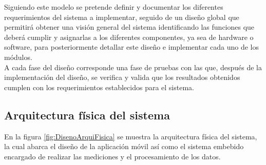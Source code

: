 \documentclass[journal]{IEEEtran}
\begin{document}
Siguiendo este modelo se pretende definir y documentar los diferentes requerimientos del sistema a implementar, seguido de un diseño global que permitirá obtener una visión general del sistema identificando las funciones que deberá cumplir y asignarlas a los diferentes componentes, ya sea de hardware o software, para posteriormente detallar este diseño e implementar cada uno de los módulos. \\

A cada fase del diseño corresponde una fase de pruebas con las que, después de la implementación del diseño, se verifica y valida que los resultados obtenidos cumplen con los requerimientos establecidos para el sistema.

%
%
%


\subsection{Arquitectura física del sistema}
En la figura \ref{fig:DisenoArquiFisica} se muestra la arquitectura física del sistema, la cual abarca el diseño de la aplicación móvil así como el sistema embebido encargado de realizar las mediciones y el procesamiento de los datos.\\
\end{document}
